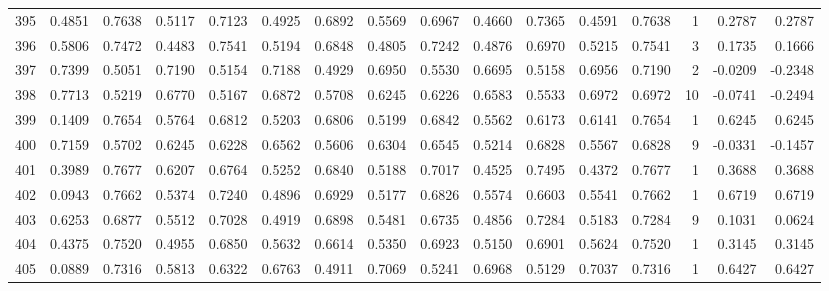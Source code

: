 \begin{tabular}{lrrrrrrrrrrrrrrr}
395 &      0.4851 &  0.7638 &  0.5117 &  0.7123 &  0.4925 &  0.6892 &  0.5569 &  0.6967 &  0.4660 &  0.7365 &   0.4591 &     0.7638 &      1 &                    0.2787 &                     0.2787 \\
396 &      0.5806 &  0.7472 &  0.4483 &  0.7541 &  0.5194 &  0.6848 &  0.4805 &  0.7242 &  0.4876 &  0.6970 &   0.5215 &     0.7541 &      3 &                    0.1735 &                     0.1666 \\
397 &      0.7399 &  0.5051 &  0.7190 &  0.5154 &  0.7188 &  0.4929 &  0.6950 &  0.5530 &  0.6695 &  0.5158 &   0.6956 &     0.7190 &      2 &                   -0.0209 &                    -0.2348 \\
398 &      0.7713 &  0.5219 &  0.6770 &  0.5167 &  0.6872 &  0.5708 &  0.6245 &  0.6226 &  0.6583 &  0.5533 &   0.6972 &     0.6972 &     10 &                   -0.0741 &                    -0.2494 \\
399 &      0.1409 &  0.7654 &  0.5764 &  0.6812 &  0.5203 &  0.6806 &  0.5199 &  0.6842 &  0.5562 &  0.6173 &   0.6141 &     0.7654 &      1 &                    0.6245 &                     0.6245 \\
400 &      0.7159 &  0.5702 &  0.6245 &  0.6228 &  0.6562 &  0.5606 &  0.6304 &  0.6545 &  0.5214 &  0.6828 &   0.5567 &     0.6828 &      9 &                   -0.0331 &                    -0.1457 \\
401 &      0.3989 &  0.7677 &  0.6207 &  0.6764 &  0.5252 &  0.6840 &  0.5188 &  0.7017 &  0.4525 &  0.7495 &   0.4372 &     0.7677 &      1 &                    0.3688 &                     0.3688 \\
402 &      0.0943 &  0.7662 &  0.5374 &  0.7240 &  0.4896 &  0.6929 &  0.5177 &  0.6826 &  0.5574 &  0.6603 &   0.5541 &     0.7662 &      1 &                    0.6719 &                     0.6719 \\
403 &      0.6253 &  0.6877 &  0.5512 &  0.7028 &  0.4919 &  0.6898 &  0.5481 &  0.6735 &  0.4856 &  0.7284 &   0.5183 &     0.7284 &      9 &                    0.1031 &                     0.0624 \\
404 &      0.4375 &  0.7520 &  0.4955 &  0.6850 &  0.5632 &  0.6614 &  0.5350 &  0.6923 &  0.5150 &  0.6901 &   0.5624 &     0.7520 &      1 &                    0.3145 &                     0.3145 \\
405 &      0.0889 &  0.7316 &  0.5813 &  0.6322 &  0.6763 &  0.4911 &  0.7069 &  0.5241 &  0.6968 &  0.5129 &   0.7037 &     0.7316 &      1 &                    0.6427 &                     0.6427 \\

\end{tabular}
